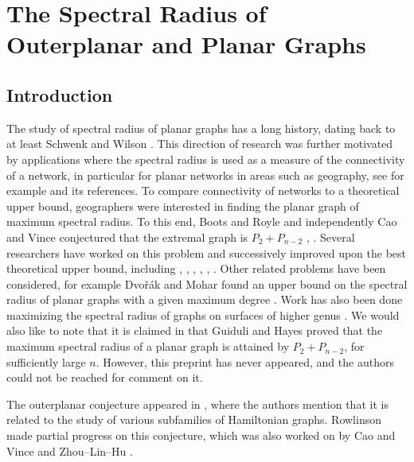 \chapter{The Spectral Radius of Outerplanar and Planar Graphs}
\section{Introduction}

The study of spectral radius of planar graphs has a long history, dating back to at least Schwenk
and Wilson \cite{SchwenkWilson1978}.  This direction
of research was further motivated by applications where the spectral
radius is used as a measure of the connectivity of a network, in
particular for planar
networks in areas such as geography, see for example \cite{BootsRoyle1991}
and its references.  To compare connectivity of networks to a theoretical upper bound, geographers were
interested in finding the planar graph of maximum spectral radius. To this end, Boots and Royle and
independently Cao and Vince conjectured that the extremal graph is $P_2 + P_{n-2}$
\cite{BootsRoyle1991}, \cite{CaoVince1993}. Several researchers have worked on this problem and
successively improved upon the best theoretical upper bound, including \cite{Hong1988},
\cite{CaoVince1993}, \cite{Hong1995}, \cite{Guiduli1996}, \cite{Hong1998},
\cite{EllinghamZha2000}. Other related problems have been considered, for example Dvo\v{r}\'{a}k
and Mohar found an upper bound on the spectral radius of planar graphs
with a given maximum degree \cite{DvorakMohar2010}. Work has also been done maximizing the spectral radius of graphs on surfaces of higher genus \cite{EllinghamZha2000, Hong1995, Hong1998}. We would also like to note that it is claimed in \cite{EllinghamZha2000} that Guiduli and Hayes proved
that the maximum spectral radius of a planar graph is attained by $P_2 + P_{n-2}$,
for sufficiently large $n$. However, this preprint has never appeared, and the authors
could not be reached for comment on it.


The outerplanar conjecture appeared
in \cite{CvetkovicRowlinson1990}, where the authors mention that it is related
to the study of various subfamilies of Hamiltonian graphs.
Rowlinson \cite{Rowlinson1990} made partial progress on this conjecture, which
was also worked on by Cao and Vince \cite{CaoVince1993} and Zhou--Lin--Hu \cite{ZhouLinHu2001}.



